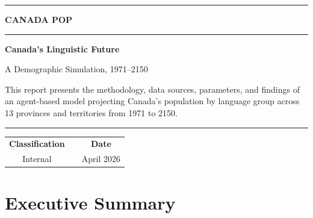\documentclass[11pt,a4paper]{article}
\begin{document}
\thispagestyle{empty}
\begin{titlepage}
  \pagecolor{navy}
  \color{white}
  \vspace*{3cm}
  \begin{center}
    {\color{gold}\rule{0.15\linewidth}{2pt}}
    \hspace{0.5em}
    {\Large\bfseries CANADA POP}
    \hspace{0.5em}
    {\color{gold}\rule{0.15\linewidth}{2pt}}

    \vspace{1.2cm}
    {\Huge\bfseries Canada's Linguistic Future}

    \vspace{0.4cm}
    {\large\color{gold} A Demographic Simulation, 1971--2150}

    \vspace{2.5cm}
    \begin{tcolorbox}[
      colback=white!10!navy,
      colframe=gold,
      arc=4pt,
      boxrule=1pt,
      width=0.75\textwidth,
      halign=center
    ]
      \small
      This report presents the methodology, data sources, parameters, and
      findings of an agent-based model projecting Canada's population by
      language group across 13 provinces and territories from 1971 to 2150.
    \end{tcolorbox}

    \vfill
    {\color{midgrey}\rule{\linewidth}{0.4pt}}
    \vspace{0.4cm}

    \begin{tabular}{ccc}
      \textbf{Classification} & \quad & \textbf{Date} \\
      Internal & & April 2026
    \end{tabular}
  \end{center}
\end{titlepage}
\nopagecolor

\newpage
\thispagestyle{empty}
\tableofcontents
\newpage

\section*{Executive Summary}
\end{document}
